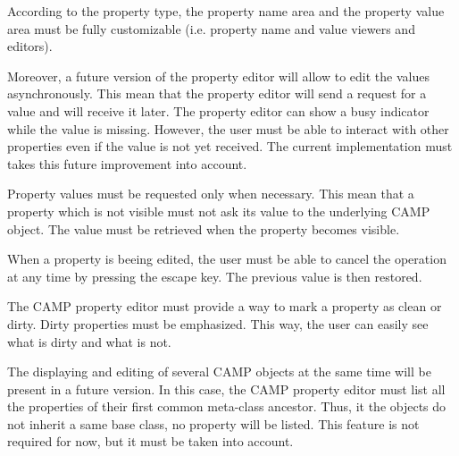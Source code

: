 \documentclass[a4paper, twoside]{report}
\begin{document}

According to the property type, the property name area and the property value area must be fully
customizable (i.e. property name and value viewers and editors).

Moreover, a future version of the property editor will allow to edit the values asynchronously. This
mean that the property editor will send a request for a value and will receive it later. The property
editor can show a busy indicator while the value is missing. However, the user must be able to
interact with other properties even if the value is not yet received. The current implementation
must takes this future improvement into account.

Property values must be requested only when necessary. This mean that a property which is not visible
must not ask its value to the underlying CAMP object. The value must be retrieved when the property
becomes visible.

When a property is beeing edited, the user must be able to cancel the operation at any time by
pressing the escape key. The previous value is then restored.

The CAMP property editor must provide a way to mark a property as clean or dirty. Dirty properties must be
emphasized. This way, the user can easily see what is dirty and what is not.

The displaying and editing of several CAMP objects at the same time will be present in a future
version. In this case, the CAMP property editor must list all the properties of their first common
meta-class ancestor. Thus, it the objects do not inherit a same base class, no property will be
listed. This feature is not required for now, but it must be taken into account.
\end{document}
